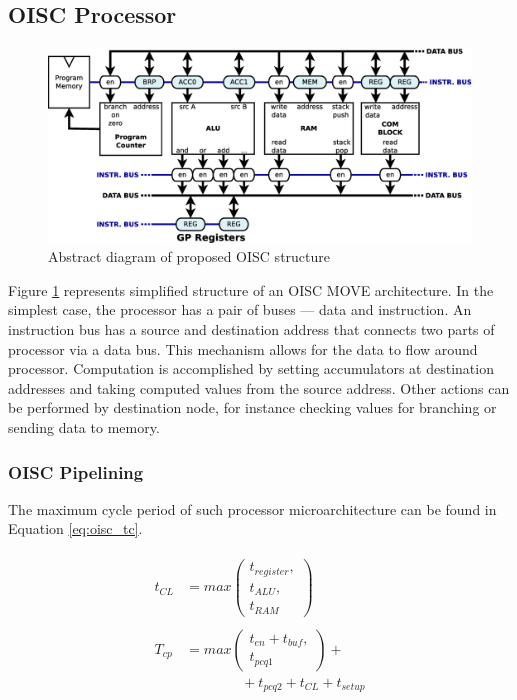 \subsection{OISC Processor}

\begin{figure}[t!]
	\centering
	\includegraphics[width=\linewidth]{../resources/oisc.eps}
	\caption{Abstract diagram of proposed OISC structure}
	\label{fig:oisc_simple}
\end{figure}

Figure \ref{fig:oisc_simple} represents simplified structure of an OISC MOVE architecture. In the simplest case, the processor has a pair of buses — data and instruction. An instruction bus has a source and destination address that connects two parts of processor via a data bus. This mechanism allows for the data to flow around processor. Computation is accomplished by setting accumulators at destination addresses and taking computed values from the source address. Other actions can be performed by destination node, for instance checking values for branching or sending data to memory. 

\subsubsection{OISC Pipelining}
The maximum cycle period of such processor microarchitecture can be found in Equation \ref{eq:oisc_tc}. 

\begin{multline}\label{eq:oisc_tc}
	\begin{split}
t_{CL} &= max \left( \begin{matrix}
t_{register},\\
t_{ALU},\\
t_{RAM}\end{matrix}\right)\\
&\\
T_{cp} &= max \left( \begin{matrix}
t_{en} + t_{buf},\\
t_{pcq1}\end{matrix}\right) +\\
&\qquad\qquad+ t_{pcq2} + t_{CL} + t_{setup}
	\end{split}
\end{multline}


